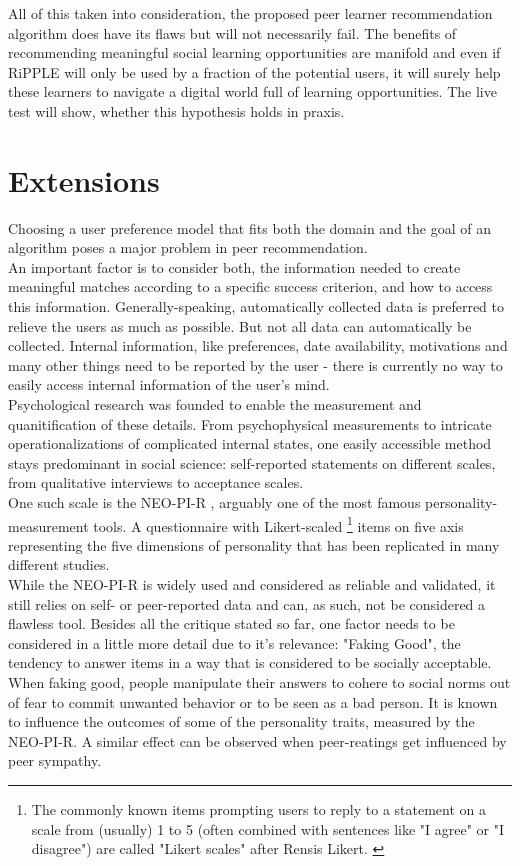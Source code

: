 \documentclass[nochapterpage,bigchapter,linedtoc,longdoc,colorback,accentcolor=tud3b,oneside]{tudreport}
\begin{document}
All of this taken into consideration, the proposed peer learner recommendation algorithm does have its flaws but will not necessarily fail. The benefits of recommending meaningful social learning opportunities are manifold and even if RiPPLE will only be used by a fraction of the potential users, it will surely help these learners to navigate a digital world full of learning opportunities. The live test will show, whether this hypothesis holds in praxis.\\


\chapter{Extensions} \label{extensions}
Choosing a user preference model that fits both the domain and the goal of an algorithm poses a major problem in peer recommendation. \cite{potts2018reciprocal, olakanmi2017group}\\
An important factor is to consider both, the information needed to create meaningful matches according to a specific success criterion, and how to access this information. Generally-speaking, automatically collected data is preferred to relieve the users as much as possible. But not all data can automatically be collected. Internal information, like preferences, date availability, motivations and many other things need to be reported by the user - there is currently no way to easily access internal information of the user's mind.\\
Psychological research was founded to enable the measurement and quanitification of these details. From psychophysical measurements to intricate operationalizations of complicated internal states, one easily accessible method stays predominant in social science: self-reported statements on different scales, from qualitative interviews to acceptance scales.\\
One such scale is the NEO-PI-R \cite{ostendorf2004neo}, arguably one of the most famous personality-measurement tools. A questionnaire with Likert-scaled \footnote{The commonly known items prompting users to reply to a statement on a scale from (usually) 1 to 5 (often combined with sentences like "I agree" or "I disagree") are called "Likert scales" after Rensis Likert. \cite{likert1932technique}} items on five axis representing the five dimensions of personality that has been replicated in many different studies. \cite{mccrae1987validation, goldberg1990alternative}\\
While the NEO-PI-R is widely used and considered as reliable and validated, it still relies on self- or peer-reported data and can, as such, not be considered a flawless tool. Besides all the critique stated so far, one factor needs to be considered in a little more detail due to it's relevance: "Faking Good", the tendency to answer items in a way that is considered to be socially acceptable. When faking good, people manipulate their answers to cohere to social norms out of fear to commit unwanted behavior or to be seen as a bad person. It is known to influence the outcomes of some of the personality traits, measured by the NEO-PI-R.\cite{griffin2004applicants} A similar effect can be observed when peer-reatings get influenced by peer sympathy. \cite{leising2010letter}\\
\end{document}
